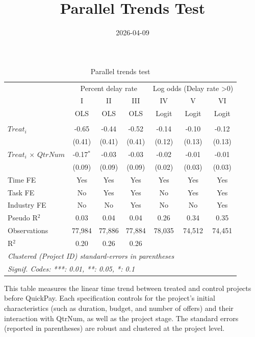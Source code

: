 \documentclass[
]{article}
\title{Parallel Trends Test}
\author{}
\date{\vspace{-2.5em}2026-04-09}
\begin{document}
\maketitle

\begin{table}[htbp]
   \caption{Parallel trends test}
   \centering
   \small
   \begin{tabular}{lcccccc}
      \toprule
       & \multicolumn{3}{c}{Percent delay rate} & \multicolumn{3}{c}{Log odds (Delay rate >0)}\\
                                   & I           & II     & III    & IV     & V      & VI\\  
                                   &  OLS        & OLS    & OLS    & Logit  & Logit  & Logit\\  
      \midrule \\
      $Treat_i$                    & -0.65       & -0.44  & -0.52  & -0.14  & -0.10  & -0.12\\   
                                   & (0.41)      & (0.41) & (0.41) & (0.12) & (0.13) & (0.13)\\   
      $Treat_i$ $\times$ $QtrNum$  & -0.17$^{*}$ & -0.03  & -0.03  & -0.02  & -0.01  & -0.01\\   
                                   & (0.09)      & (0.09) & (0.09) & (0.02) & (0.03) & (0.03)\\   
      \midrule 
      Time FE                      & Yes         & Yes    & Yes    & Yes    & Yes    & Yes\\  
      Task FE                      & No          & Yes    & Yes    & No     & Yes    & Yes\\  
      Industry FE                  & No          & No     & Yes    & No     & No     & Yes\\  
      Pseudo R$^2$                 & 0.03        & 0.04   & 0.04   & 0.26   & 0.34   & 0.35\\  
      Observations                 & 77,984      & 77,886 & 77,884 & 78,035 & 74,512 & 74,451\\  
      R$^2$                        & 0.20        & 0.26   & 0.26   &        &        & \\  
      \midrule
      \multicolumn{7}{l}{\emph{Clustered (Project ID) standard-errors in parentheses}}\\
      \multicolumn{7}{l}{\emph{Signif. Codes: ***: 0.01, **: 0.05, *: 0.1}}\\
   \end{tabular}
   
   \par \raggedright 
   This table measures the linear time trend between treated and control projects before QuickPay. Each specification controls for the project’s initial characteristics (such as duration, budget, and number of offers) and their interaction with QtrNum, as well as the project stage. The standard errors (reported in parentheses) are robust and clustered at the project level.
\end{table}
\end{document}
